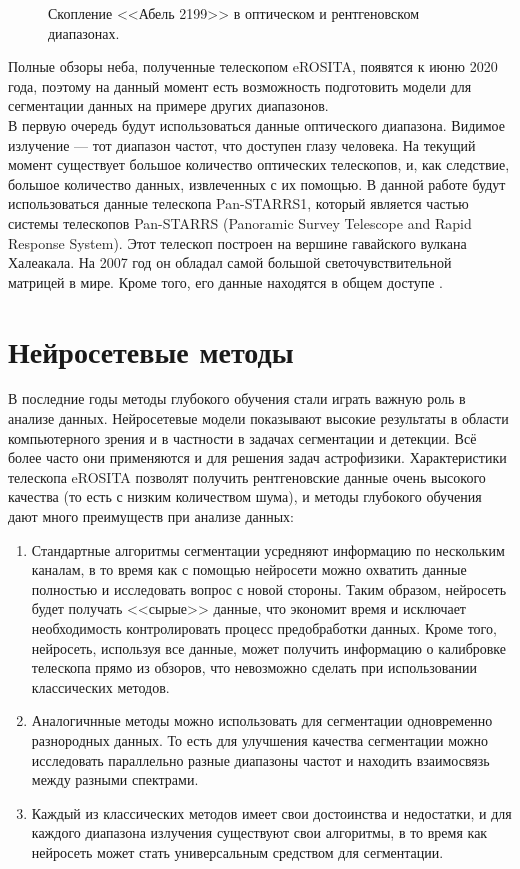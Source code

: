 \begin{figure}[h]
    \caption{Скопление <<Абель 2199>> в оптическом и рентгеновском диапазонах. \cite{Abell}}
\end{figure}

Полные обзоры неба, полученные телескопом eROSITA, появятся к июню 2020 года, поэтому на данный 
момент есть возможность подготовить модели для сегментации данных на примере других диапазонов.\\

В первую очередь будут использоваться данные оптического диапазона. Видимое излучение --- тот 
диапазон частот, что доступен глазу человека. На текущий момент существует большое количество 
оптических телескопов, и, как следствие, большое количество данных, извлеченных с их помощью. В 
данной работе будут использоваться данные телескопа Pan-STARRS1, который является частью системы 
телескопов Pan-STARRS (Panoramic Survey Telescope and Rapid Response System). Этот телескоп 
построен на вершине гавайского вулкана Халеакала. На 2007 год он обладал самой большой 
светочувствительной матрицей в мире. Кроме того, его данные находятся в общем доступе \cite{Panstarrs}.\\

\section{Нейросетевые методы}
В последние годы методы глубокого обучения стали играть важную роль в анализе данных. Нейросетевые 
модели показывают высокие результаты в области компьютерного зрения и в частности в задачах 
сегментации и детекции. Всё более часто они применяются и для решения задач астрофизики. 
Характеристики телескопа eROSITA позволят получить рентгеновские данные очень высокого качества (то 
есть с низким количеством шума), и методы глубокого обучения дают много преимуществ при анализе 
данных: 

\begin{enumerate}
    \item Стандартные алгоритмы сегментации усредняют информацию по нескольким каналам,
        в то время как с помощью нейросети можно охватить данные полностью и исследовать вопрос с 
        новой стороны. Таким образом, нейросеть будет получать <<сырые>> данные, что экономит время 
        и исключает необходимость контролировать процесс предобработки данных. 
        Кроме того, нейросеть, используя все данные, может получить информацию о 
        калибровке телескопа прямо из обзоров, что невозможно сделать при использовании классических 
        методов.
    \item Аналогичнные методы можно использовать для сегментации одновременно разнородных данных. 
        То есть для улучшения качества сегментации можно исследовать параллельно разные диапазоны 
        частот и находить взаимосвязь между разными спектрами.
    \item Каждый из классических методов имеет свои достоинства и недостатки, и для каждого 
        диапазона излучения существуют свои алгоритмы, в то время как 
        нейросеть может стать универсальным средством для сегментации.
\end{enumerate}

